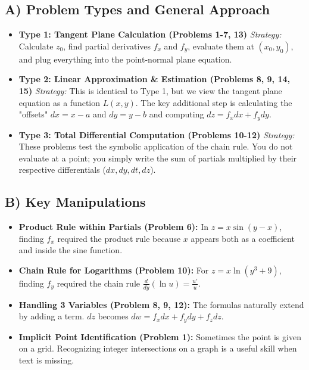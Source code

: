 \documentclass{article}
\begin{document}
\subsection{A) Problem Types and General Approach}
\begin{itemize}
    \item \textbf{Type 1: Tangent Plane Calculation (Problems 1-7, 13)}
    \textit{Strategy:} Calculate $z_0$, find partial derivatives $f_x$ and $f_y$, evaluate them at $(x_0, y_0)$, and plug everything into the point-normal plane equation.
    
    \item \textbf{Type 2: Linear Approximation \& Estimation (Problems 8, 9, 14, 15)}
    \textit{Strategy:} This is identical to Type 1, but we view the tangent plane equation as a function $L(x,y)$. The key additional step is calculating the "offsets" $dx = x - a$ and $dy = y - b$ and computing $dz = f_x dx + f_y dy$.
    
    \item \textbf{Type 3: Total Differential Computation (Problems 10-12)}
    \textit{Strategy:} These problems test the symbolic application of the chain rule. You do not evaluate at a point; you simply write the sum of partials multiplied by their respective differentials ($dx, dy, dt, dz$).
\end{itemize}

\subsection{B) Key Manipulations}
\begin{itemize}
    \item \textbf{Product Rule within Partials (Problem 6):} In $z = x \sin(y-x)$, finding $f_x$ required the product rule because $x$ appears both as a coefficient and inside the sine function.
    \item \textbf{Chain Rule for Logarithms (Problem 10):} For $z = x \ln(y^3 + 9)$, finding $f_y$ required the chain rule $\frac{d}{dy}(\ln u) = \frac{u'}{u}$.
    \item \textbf{Handling 3 Variables (Problem 8, 9, 12):} The formulas naturally extend by adding a term. $dz$ becomes $dw = f_x dx + f_y dy + f_z dz$.
    \item \textbf{Implicit Point Identification (Problem 1):} Sometimes the point is given on a grid. Recognizing integer intersections on a graph is a useful skill when text is missing.
\end{itemize}
\end{document}
